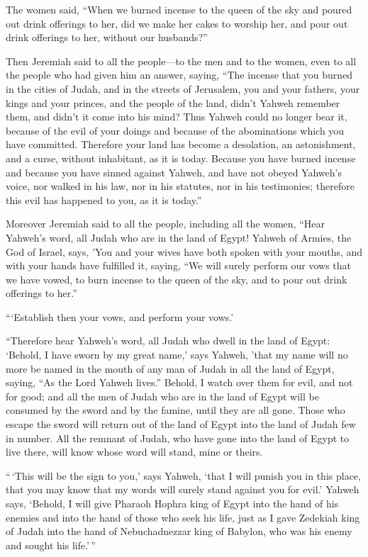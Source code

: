  The women said, ``When we burned incense to the queen of
the sky and poured out drink offerings to her, did we make her cakes to
worship her, and pour out drink offerings to her, without our
husbands?''

 Then Jeremiah said to all the people---to the men and to
the women, even to all the people who had given him an answer, saying,
 ``The incense that you burned in the cities of Judah,
and in the streets of Jerusalem, you and your fathers, your kings and
your princes, and the people of the land, didn't Yahweh remember them,
and didn't it come into his mind?  Thus Yahweh could no
longer bear it, because of the evil of your doings and because of the
abominations which you have committed. Therefore your land has become a
desolation, an astonishment, and a curse, without inhabitant, as it is
today.  Because you have burned incense and because you
have sinned against Yahweh, and have not obeyed Yahweh's voice, nor
walked in his law, nor in his statutes, nor in his testimonies;
therefore this evil has happened to you, as it is today.''

 Moreover Jeremiah said to all the people, including all
the women, ``Hear Yahweh's word, all Judah who are in the land of Egypt!
 Yahweh of Armies, the God of Israel, says, 'You and your
wives have both spoken with your mouths, and with your hands have
fulfilled it, saying, ``We will surely perform our vows that we have
vowed, to burn incense to the queen of the sky, and to pour out drink
offerings to her.''

```Establish then your vows, and perform your vows.'

 ``Therefore hear Yahweh's word, all Judah who dwell in
the land of Egypt: `Behold, I have sworn by my great name,' says Yahweh,
'that my name will no more be named in the mouth of any man of Judah in
all the land of Egypt, saying, ``As the Lord Yahweh lives.''
 Behold, I watch over them for evil, and not for good;
and all the men of Judah who are in the land of Egypt will be consumed
by the sword and by the famine, until they are all gone. 
Those who escape the sword will return out of the land of Egypt into the
land of Judah few in number. All the remnant of Judah, who have gone
into the land of Egypt to live there, will know whose word will stand,
mine or theirs.

 ``\,`This will be the sign to you,' says Yahweh, `that I
will punish you in this place, that you may know that my words will
surely stand against you for evil.'  Yahweh says,
`Behold, I will give Pharaoh Hophra king of Egypt into the hand of his
enemies and into the hand of those who seek his life, just as I gave
Zedekiah king of Judah into the hand of Nebuchadnezzar king of Babylon,
who was his enemy and sought his life.'\,''

